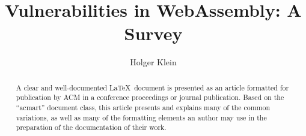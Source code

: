 \documentclass[sigconf]{acmart}
\begin{document}
\title{Vulnerabilities in WebAssembly: A Survey}

\author{Holger Klein}


\renewcommand{\shortauthors}{Holger Klein}

\begin{abstract}
  A clear and well-documented \LaTeX\ document is presented as an
  article formatted for publication by ACM in a conference proceedings
  or journal publication. Based on the ``acmart'' document class, this
  article presents and explains many of the common variations, as well
  as many of the formatting elements an author may use in the
  preparation of the documentation of their work.
\end{abstract}



\end{document}

